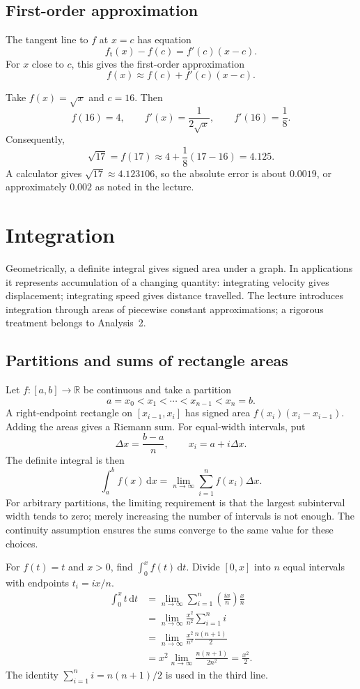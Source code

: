 \subsection{First-order approximation}
The tangent line to $f$ at $x=c$ has equation
\[
 f_{\mathrm t}(x)-f(c)=f'(c)(x-c).
\]
For $x$ close to $c$, this gives the first-order approximation
\[
 \boxed{f(x)\approx f(c)+f'(c)(x-c)}.
\]
\begin{example}
Take $f(x)=\sqrt{x}$ and $c=16$. Then
\[
 f(16)=4,\qquad f'(x)=\frac{1}{2\sqrt{x}},\qquad f'(16)=\frac18.
\]
Consequently,
\[
 \sqrt{17}=f(17)\approx4+\frac18(17-16)=4.125.
\]
A calculator gives $\sqrt{17}\approx4.123106$, so the absolute error
is about $0.0019$, or approximately $0.002$ as noted in the lecture.
\end{example}

\section{Integration}

Geometrically, a definite integral gives signed area under a graph.
In applications it represents accumulation of a changing quantity: integrating
velocity gives displacement; integrating speed gives distance travelled.
The lecture introduces integration through areas of piecewise constant
approximations; a rigorous treatment belongs to Analysis~2.

\subsection{Partitions and sums of rectangle areas}
Let $f:[a,b]\to\mathbb R$ be continuous and take a partition
\[
 a=x_0<x_1<\cdots<x_{n-1}<x_n=b.
\]
A right-endpoint rectangle on $[x_{i-1},x_i]$ has signed area
$f(x_i)(x_i-x_{i-1})$. Adding the areas gives a Riemann sum.
For equal-width intervals, put
\[
 \Delta x=\frac{b-a}{n},\qquad x_i=a+i\Delta x.
\]
The definite integral is then
\[
 \boxed{\int_a^b f(x)\,\mathrm dx
 =\lim_{n\to\infty}\sum_{i=1}^n f(x_i)\Delta x}.
\]
For arbitrary partitions, the limiting requirement is that the largest
subinterval width tends to zero; merely increasing the number of intervals
is not enough. The continuity assumption ensures the sums converge to the
same value for these choices.

\begin{example}
For $f(t)=t$ and $x>0$, find $\int_0^x f(t)\,\mathrm dt$.
Divide $[0,x]$ into $n$ equal intervals with endpoints $t_i=ix/n$.
\begin{align*}
 \int_0^x t\,\mathrm dt
 &=\lim_{n\to\infty}\sum_{i=1}^n
    \left(\frac{ix}{n}\right)\frac{x}{n}\\
 &=\lim_{n\to\infty}\frac{x^2}{n^2}\sum_{i=1}^n i\\
 &=\lim_{n\to\infty}\frac{x^2}{n^2}\frac{n(n+1)}2\\
 &=x^2\lim_{n\to\infty}\frac{n(n+1)}{2n^2}
 =\frac{x^2}{2}.
\end{align*}
The identity $\sum_{i=1}^n i=n(n+1)/2$ is used in the third line.
\end{example}

